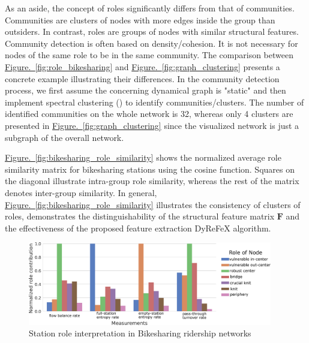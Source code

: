 \documentclass[a4paper,fleqn]{cas-sc}
\begin{document}
As an aside, the concept of roles significantly differs from that of communities. Communities are clusters of nodes with more edges inside the group than outsiders. In contrast, roles are groups of nodes with similar structural features. Community detection is often based on density/cohesion. It is not necessary for nodes of the same role to be in the same community. The comparison between \hyperref[fig:role_bikesharing]{Figure.~\ref{fig:role_bikesharing}} and \hyperref[fig:graph_clustering]{Figure.~\ref{fig:graph_clustering}} presents a concrete example illustrating their differences. In the community detection process, we first assume the concerning dynamical graph is "static" and then implement spectral clustering (\citep{white2005spectral}) to identify communities/clusters. The number of identified communities on the whole network is 32, whereas only 4 clusters are presented in \hyperref[fig:graph_clustering]{Figure.~\ref{fig:graph_clustering}} since the visualized network is just a subgraph of the overall network.

\hyperref[fig:bikesharing_role_similarity]{Figure.~\ref{fig:bikesharing_role_similarity}} shows the normalized average role similarity matrix for bikesharing stations using the cosine function. Squares on the diagonal illustrate intra-group role similarity, whereas the rest of the matrix denotes inter-group similarity. In general, \hyperref[fig:bikesharing_role_similarity]{Figure.~\ref{fig:bikesharing_role_similarity}} illustrates the consistency of clusters of roles, demonstrates the distinguishability of the structural feature matrix $\mathbf{F}$ and the effectiveness of the proposed feature extraction DyReFeX algorithm.

\begin{figure}[!htb]
  \centering
  \includegraphics[width=0.95\textwidth]{figs/sense_making.pdf}
  \caption{Station role interpretation in Bikesharing ridership networks}\label{fig:sense_making}
\end{figure}
\end{document}
